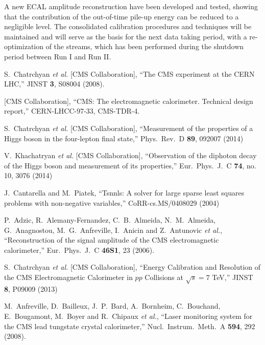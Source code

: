 \documentclass[journal]{IEEEtran}
\begin{document}
A new ECAL amplitude reconstruction have been developed and tested, showing that the contribution of the out-of-time pile-up energy can be reduced to a negligible level. 
The consolidated calibration procedures and techniques will be maintained and will serve as the basis for the next data taking period, with a re-optimization of the streams, which has been performed during the shutdown period between Run I and Run II.


\ifCLASSOPTIONcaptionsoff
  \newpage
\fi


\begin{thebibliography}{1}

  S.~Chatrchyan {\it et al.}  [CMS Collaboration], ``The CMS experiment at the CERN LHC,'' JINST {\bf 3}, S08004 (2008).

  [CMS Collaboration], ``CMS: The electromagnetic calorimeter. Technical design report,''  CERN-LHCC-97-33, CMS-TDR-4.

  S.~Chatrchyan {\it et al.}  [CMS Collaboration], ``Measurement of the properties of a Higgs boson in the four-lepton final state,''
  Phys.\ Rev.\ D {\bf 89}, 092007 (2014)

  V.~Khachatryan {\it et al.}  [CMS Collaboration], ``Observation of the diphoton decay of the Higgs boson and measurement of its properties,''  Eur.\ Phys.\ J.\ C {\bf 74}, no. 10, 3076 (2014)

J.~Cantarella and M.~Piatek, ``Tsnnls: A solver for large sparse least squares problems with non-negative variables,'' CoRR-cs.MS/0408029 (2004)

  P.~Adzic, R.~Alemany-Fernandez, C.~B.~Almeida, N.~M.~Almeida, G.~Anagnostou, M.~G.~Anfreville, I.~Anicin and Z.~Antunovic {\it et al.}, ``Reconstruction of the signal amplitude of the CMS electromagnetic calorimeter,''  Eur.\ Phys.\ J.\ C {\bf 46S1}, 23 (2006).

  S.~Chatrchyan {\it et al.}  [CMS Collaboration], ``Energy Calibration and Resolution of the CMS Electromagnetic Calorimeter in $pp$ Collisions at $\sqrt{s} = 7$ TeV,''   JINST {\bf 8}, P09009 (2013)

  M.~Anfreville, D.~Bailleux, J.~P.~Bard, A.~Bornheim, C.~Bouchand, E.~Bougamont, M.~Boyer and R.~Chipaux {\it et al.}, ``Laser monitoring system for the CMS lead tungstate crystal calorimeter,''  Nucl.\ Instrum.\ Meth.\ A {\bf 594}, 292 (2008).


\end{thebibliography}
\end{document}
